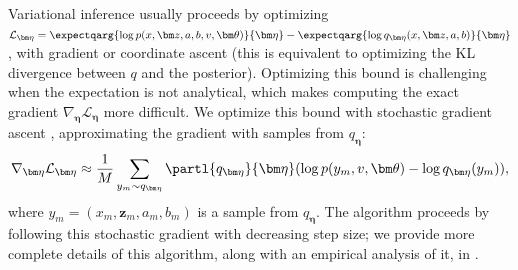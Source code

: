 Variational inference usually proceeds by optimizing $\mathcal{L}_{\bm
  \eta} = \expectqarg{ \log p(x, \bm z, a, b, v, \bm \theta) }{\bm
  \eta} - \expectqarg{ \log q_{\bm \eta}(x, \bm z, a, b) }{\bm \eta}$,
with gradient or coordinate ascent (this is equivalent to optimizing
the KL divergence between $q$ and the posterior).  Optimizing this
bound is challenging when the expectation is not analytical, which
makes computing the exact gradient $\nabla_{\bm \eta} \mathcal{L}_{\bm
  \eta}$ more difficult.  We optimize this bound with stochastic
gradient ascent \citep{robbins:1951,bottou:2004}, approximating the
gradient with samples from $q_{\bm \eta}$:
\begin{align}
\nabla_{\bm \eta} \mathcal{L}_{\bm \eta}
  \approx \frac{1}{M} \sum_{y_m \sim q_{\bm \eta}}
    \partl{q_{\bm \eta}}{\bm \eta}( \log p(y_m, v, \bm \theta) - \log q_{\bm \eta}(y_m)
    ),
    \label{eq:approx_elbo_gradient}
\end{align}
where $y_m=(x_m, \bm z_m, a_m, b_m)$ is a sample from $q_{\bm
  \eta}$. The algorithm proceeds by following this stochastic gradient
with decreasing step size; we provide more complete details of this
algorithm, along with an empirical analysis of it, in
.



